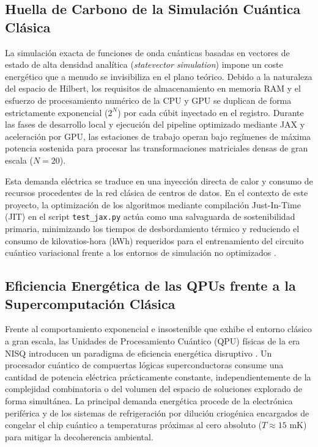 \subsection{Huella de Carbono de la Simulación Cuántica Clásica}
La simulación exacta de funciones de onda cuánticas basadas en vectores de estado de alta densidad analítica (\textit{statevector simulation}) impone un coste energético que a menudo se invisibiliza en el plano teórico. Debido a la naturaleza del espacio de Hilbert, los requisitos de almacenamiento en memoria RAM y el esfuerzo de procesamiento numérico de la CPU y GPU se duplican de forma estrictamente exponencial ($2^N$) por cada cúbit inyectado en el registro. Durante las fases de desarrollo local y ejecución del pipeline optimizado mediante JAX y aceleración por GPU, las estaciones de trabajo operan bajo regímenes de máxima potencia sostenida para procesar las transformaciones matriciales densas de gran escala ($N=20$).

Esta demanda eléctrica se traduce en una inyección directa de calor y consumo de recursos procedentes de la red clásica de centros de datos. En el contexto de este proyecto, la optimización de los algoritmos mediante compilación Just-In-Time (JIT) en el script \texttt{test\_jax.py} actúa como una salvaguarda de sostenibilidad primaria, minimizando los tiempos de desbordamiento térmico y reduciendo el consumo de kilovatios-hora (kWh) requeridos para el entrenamiento del circuito cuántico variacional frente a los entornos de simulación no optimizados \cite{GreenQuantum2023}.

\subsection{Eficiencia Energética de las QPUs frente a la Supercomputación Clásica}
Frente al comportamiento exponencial e insostenible que exhibe el entorno clásico a gran escala, las Unidades de Procesamiento Cuántico (QPU) físicas de la era NISQ introducen un paradigma de eficiencia energética disruptivo \cite{Preskill2018}. Un procesador cuántico de compuertas lógicas superconductoras consume una cantidad de potencia eléctrica prácticamente constante, independientemente de la complejidad combinatoria o del volumen del espacio de soluciones explorado de forma simultánea. La principal demanda energética procede de la electrónica periférica y de los sistemas de refrigeración por dilución criogénica encargados de congelar el chip cuántico a temperaturas próximas al cero absoluto ($T \approx 15 \text{ mK}$) para mitigar la decoherencia ambiental.

